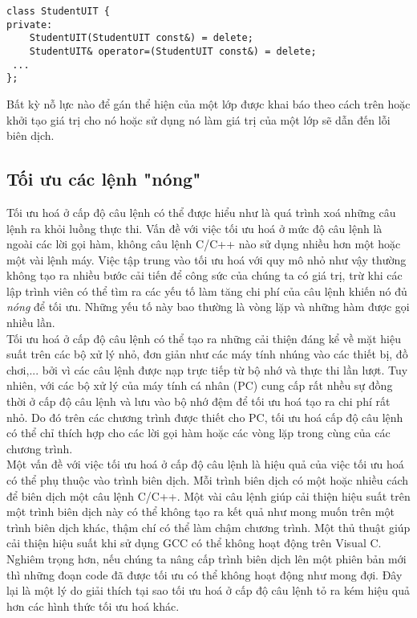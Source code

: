 \documentclass{article}
\begin{document}
\begin{verbatim}
class StudentUIT {
private:
    StudentUIT(StudentUIT const&) = delete;
    StudentUIT& operator=(StudentUIT const&) = delete;
 ...
};
\end{verbatim}

Bất kỳ nỗ lực nào để gán thể hiện của một lớp được khai báo theo cách trên hoặc khởi tạo giá trị cho nó hoặc sử dụng nó làm giá trị của một lớp sẽ dẫn đến lỗi biên dịch.



\subsection{Tối ưu các lệnh "nóng"}
Tối ưu hoá ở cấp độ câu lệnh có thể được hiểu như là quá trình xoá những câu lệnh ra khỏi luồng thực thi. Vấn đề với việc tối ưu hoá ở mức độ câu lệnh là ngoài các lời gọi hàm, không câu lệnh C/C++ nào sử dụng nhiều hơn một hoặc một vài lệnh máy. Việc tập trung vào tối ưu hoá với quy mô nhỏ như vậy thường không tạo ra nhiều bước cải tiến để công sức của chúng ta có giá trị, trừ khi các lập trình viên có thể tìm ra các yếu tố làm tăng chi phí của câu lệnh khiến nó đủ \textit{nóng} để tối ưu. Những yếu tố này bao thường là vòng lặp và những hàm được gọi nhiều lần.\\

Tối ưu hoá ở cấp độ câu lệnh có thể tạo ra những cải thiện đáng kể về mặt hiệu suất trên các bộ xử lý nhỏ, đơn giản như các máy tính nhúng vào các thiết bị, đồ chơi,... bởi vì các câu lệnh được nạp trực tiếp từ bộ nhớ và thực thi lần lượt. Tuy nhiên, với các bộ xử lý của máy tính cá nhân (PC) cung cấp rất nhều sự đồng thời ở cấp độ câu lệnh và lưu vào bộ nhớ đệm để tối ưu hoá tạo ra chi phí rất nhỏ. Do đó trên các chương trình được thiết cho PC, tối ưu hoá cấp độ câu lệnh có thể chỉ thích hợp cho các lời gọi hàm hoặc các vòng lặp trong cùng của các chương trình.\\

Một vấn đề với việc tối ưu hoá ở cấp độ câu lệnh là hiệu quả của việc tối ưu hoá có thể phụ thuộc vào trình biên dịch. Mỗi trình biên dịch có một hoặc nhiều cách để biên dịch một câu lệnh C/C++. Một vài câu lệnh giúp cải thiện hiệu suất trên một trình biên dịch này có thể không tạo ra kết quả như mong muốn trên một trình biên dịch khác, thậm chí có thể làm chậm chương trình. Một thủ thuật giúp cải thiện hiệu suất khi sử dụng GCC có thể không hoạt động trên Visual C. Nghiêm trọng hơn, nếu chúng ta nâng cấp trình biên dịch lên một phiên bản mới thì những đoạn code đã được tối ưu có thể không hoạt động như mong đợi. Đây lại là một lý do giải thích tại sao tối ưu hoá ở cấp độ câu lệnh tỏ ra kém hiệu quả hơn các hình thức tối ưu hoá khác.\\
\end{document}
